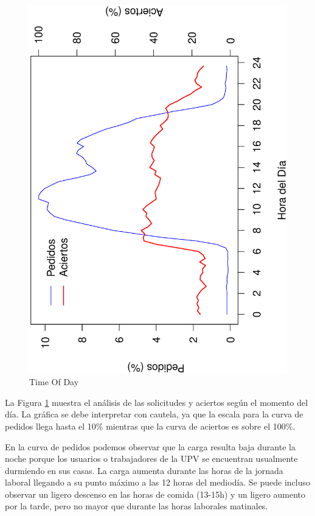 \documentclass[twocolumn]{Jornadas}
\begin{document}
\begin{figure}[]
\begin{center}
  \includegraphics[scale=0.30,angle=-90]{figures/TimeOfDay3_full.eps}
\end{center}
\caption{Time Of Day} \label{Timeday}
\end{figure}

La Figura \ref{Timeday} muestra el análisis de las solicitudes y aciertos según el momento del día. La gráfica se debe interpretar con cautela, ya que la escala para la curva de pedidos llega hasta el 10\% mientras que la curva de aciertos es sobre el 100\%. 

En la curva de pedidos podemos observar que la carga resulta baja durante la noche porque los usuarios o trabajadores de la UPV se encuentran usualmente durmiendo en sus casas. La carga aumenta durante las horas de la jornada laboral llegando a su punto máximo a las 12 horas del mediodía. Se puede incluso observar un ligero descenso en las horas de comida (13-15h) y un ligero aumento por la tarde, pero no mayor que durante las horas laborales matinales.
\end{document}
